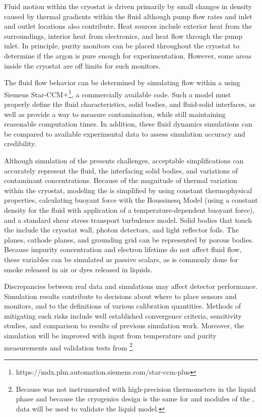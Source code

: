Fluid motion within the cryostat is driven primarily by small changes in density caused by thermal gradients within the fluid although pump flow rates and inlet and outlet locations also contribute. Heat sources include exterior heat from the surroundings, interior heat from electronics, and heat flow through the pump inlet. In principle, purity monitors can be placed throughout the cryostat to determine if the argon is pure enough for experimentation. However, some areas inside the cryostat are off limits for such monitors. 


The fluid flow behavior can be determined by simulating  flow within a  %
using Siemens Star-CCM$+$\footnote{https://mdx.plm.automation.siemens.com/star-ccm-plus}, a commercially available  code.  Such a model must properly define the fluid characteristics, solid bodies, and fluid-solid interfaces, as well as provide a way to measure contamination, while still maintaining reasonable computation times. In addition, these fluid dynamics simulations can be compared to available experimental data to assess simulation accuracy and credibility. 


Although simulation of the  presents challenges, %
acceptable simplifications can %
accurately represent the fluid, the interfacing solid bodies, and variations of contaminant concentrations. Because of the magnitude of thermal variation within the cryostat, modeling the \lar is simplified by using constant thermophysical properties, calculating buoyant force with the Boussinesq Model (using a constant density for the fluid with application of a temperature-dependent buoyant force), and a standard shear stress transport turbulence model. Solid bodies that touch the \lar include the cryostat wall, photon detectors, and light reflector foils.  
The  planes, cathode planes, and grounding grid can be represented by porous bodies. Because impurity concentration and electron lifetime do not affect fluid flow, these variables can be simulated as passive scalars, as is commonly done for smoke released \cite{cfd-1} 
in air or dyes released in liquids.


Discrepancies between real data and simulations may affect detector performance. %
Simulation results contribute to decisions about where to place sensors and monitors, and to %
the definitions of various calibration quantities. Methods of mitigating such risks include well established convergence criteria, sensitivity studies, and comparison to results of previous  simulation work. Moreover, the simulation will be improved with input from \lar temperature and purity measurements and validation tests from \footnote{Because  was not instrumented with high-precision thermometers in the liquid phase and because the cryogenics design is the same for  and  modules of the  ,  data will be used to validate the liquid  model.}. 

